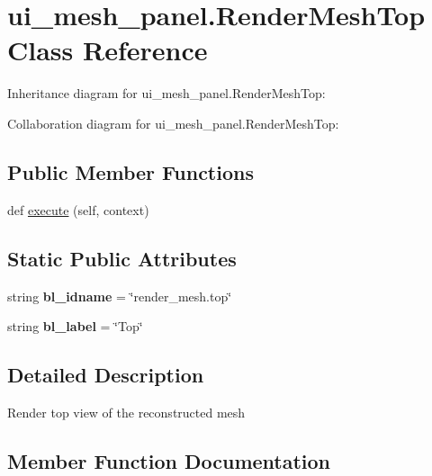 \hypertarget{classui__mesh__panel_1_1RenderMeshTop}{}\section{ui\+\_\+mesh\+\_\+panel.\+Render\+Mesh\+Top Class Reference}
\label{classui__mesh__panel_1_1RenderMeshTop}


Inheritance diagram for ui\+\_\+mesh\+\_\+panel.\+Render\+Mesh\+Top\+:


Collaboration diagram for ui\+\_\+mesh\+\_\+panel.\+Render\+Mesh\+Top\+:
\subsection*{Public Member Functions}
\begin{DoxyCompactItemize}
\item 
def \hyperlink{classui__mesh__panel_1_1RenderMeshTop_a4cb8378963cfb8a5d558396776844d13}{execute} (self, context)
\end{DoxyCompactItemize}
\subsection*{Static Public Attributes}
\begin{DoxyCompactItemize}
\item 
string {\bfseries bl\+\_\+idname} = \char`\"{}render\+\_\+mesh.\+top\char`\"{}\hypertarget{classui__mesh__panel_1_1RenderMeshTop_a52e34645ec1660cd9a2653e0f8222bb4}{}\label{classui__mesh__panel_1_1RenderMeshTop_a52e34645ec1660cd9a2653e0f8222bb4}

\item 
string {\bfseries bl\+\_\+label} = \char`\"{}Top\char`\"{}\hypertarget{classui__mesh__panel_1_1RenderMeshTop_a13cacbdf371e5c75652aaaa69b54c3cc}{}\label{classui__mesh__panel_1_1RenderMeshTop_a13cacbdf371e5c75652aaaa69b54c3cc}

\end{DoxyCompactItemize}


\subsection{Detailed Description}
\begin{DoxyVerb}Render top view of the reconstructed mesh\end{DoxyVerb}
 

\subsection{Member Function Documentation}
